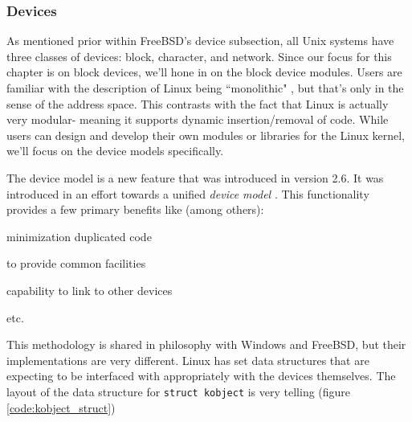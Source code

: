 \documentclass[10pt,draftclsnofoot,onecolumn]{IEEEtran}
\begin{document}
\subsubsection{Devices}
\label{sub:Devices Linux}
\par As mentioned prior within FreeBSD's device subsection, all Unix systems have three classes of devices: block, character, and network.
Since our focus for this chapter is on block devices, we'll hone in on the block device modules.
Users are familiar with the description of Linux being ``monolithic" \cite{linux:1}, but that's only in the sense of the address space.
This contrasts with the fact that Linux is actually very modular- meaning it supports dynamic insertion/removal of code.
While users can design and develop their own modules or libraries for the Linux kernel, we'll focus on the device models specifically.

\par The device model is a new feature that was introduced in version 2.6.
It was introduced in an effort towards a unified \textit{device model} \cite{linux:1}.
This functionality provides a few primary benefits like (among others):
\begin{list}{-}{}
\item minimization duplicated code
\item to provide common facilities
\item capability to link to other devices
\item etc.
\end{list}
This methodology is shared in philosophy with Windows and FreeBSD, but their implementations are very different.
Linux has set data structures that are expecting to be interfaced with appropriately with the devices themselves.
The layout of the data structure for \texttt{struct kobject} is very telling (figure \ref{code:kobject_struct})
\end{document}
